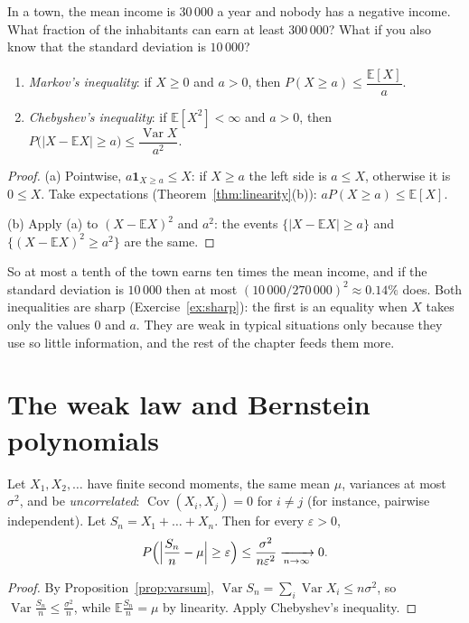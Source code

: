 \begin{think}
In a town, the mean income is $30\,000$ a year and nobody has a negative income. What fraction of the inhabitants
can earn at least $300\,000$? What if you also know that the standard deviation is $10\,000$?
\end{think}

\begin{proposition}\label{prop:markov}
\begin{enumerate}[label=(\alph*)]
\item \emph{Markov's inequality}: if $X\ge0$ and $a>0$, then $P(X\ge a)\le\dfrac{\mathbb E[X]}a$.
\item \emph{Chebyshev's inequality}: if $\mathbb E[X^2]<\infty$ and $a>0$, then $P\bigl(|X-\mathbb EX|\ge a\bigr)\le\dfrac{\operatorname{Var}X}{a^2}$.
\end{enumerate}
\end{proposition}
\begin{proof}
(a) Pointwise, $a\mathbf 1_{X\ge a}\le X$: if $X\ge a$ the left side is $a\le X$, otherwise it is $0\le X$. Take expectations
(Theorem~\ref{thm:linearity}(b)): $aP(X\ge a)\le\mathbb E[X]$.

(b) Apply (a) to $(X-\mathbb EX)^2$ and $a^2$: the events $\{|X-\mathbb EX|\ge a\}$ and $\{(X-\mathbb EX)^2\ge a^2\}$ are the same.
\end{proof}

So at most a tenth of the town earns ten times the mean income, and if the standard deviation is $10\,000$ then
at most $(10\,000/270\,000)^2\approx0.14\%$ does. Both inequalities are sharp (Exercise~\ref{ex:sharp}): the
first is an equality when $X$ takes only the values $0$ and $a$. They are weak in typical situations only because
they use so little information, and the rest of the chapter feeds them more.

\section{The weak law and Bernstein polynomials}

\begin{theorem}\label{thm:weaklaw}
Let $X_1,X_2,\ldots$ have finite second moments, the same mean $\mu$, variances at most $\sigma^2$, and be
\emph{uncorrelated}: $\operatorname{Cov}(X_i,X_j)=0$ for $i\ne j$ (for instance, pairwise independent). Let $S_n=X_1+\dots+X_n$. Then for every $\varepsilon>0$,
\[
P\Bigl(\Bigl|\frac{S_n}n-\mu\Bigr|\ge\varepsilon\Bigr)\le\frac{\sigma^2}{n\varepsilon^2}\xrightarrow[n\to\infty]{}0.
\]
\end{theorem}
\begin{proof}
By Proposition~\ref{prop:varsum}, $\operatorname{Var}S_n=\sum_i\operatorname{Var}X_i\le n\sigma^2$, so $\operatorname{Var}\frac{S_n}n\le\frac{\sigma^2}n$, while $\mathbb E\frac{S_n}n=\mu$ by
linearity. Apply Chebyshev's inequality.
\end{proof}

